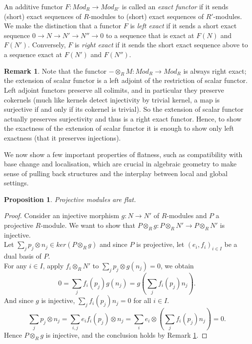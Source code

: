 \documentclass{article}
\theoremstyle{plain}
\newtheorem{proposition}[theorem]{Proposition}
\theoremstyle{definition}
\newtheorem{remark}{Remark}
\begin{document}
\noindent An additive functor $F:Mod_R\rightarrow Mod_{R'}$ is called an \textit{exact functor} if it sends (short) exact sequences of $R$-modules to (short) exact sequences of $R'$-modules. 
We make the distinction that a functor $F$ is \textit{left exact} if it sends a short exact sequence
$0 \rightarrow N \rightarrow N' \rightarrow N'' \rightarrow 0$ to a sequence that is exact at $F(N)$ and $F(N')$. Conversely, $F$ is \textit{right exact} if it sends the short exact sequence above to a sequence exact at $F(N')$ and $F(N'')$.



\begin{remark}
\label{restriction_on_showing_exactness}
Note that the functor $-\otimes_RM:Mod_R \rightarrow Mod_R$ is always right exact;
the extension of scalar functor is a left adjoint of the restriction of scalar functor. 
Left adjoint functors preserve all colimits, and in particular they preserve cokernels (much like kernels detect injectivity by trivial kernel, a map is surjective if and only if its cokernel is trivial). 
So the extension of scalar functor actually preserves surjectivity and thus is a right exact functor.
Hence, to show the exactness of the extension of scalar functor it is enough to show only left exactness (that it preserves injections).
\end{remark}

\noindent We now show a few important properties of flatness, such as compatibility with base change and localisation, which are crucial in algebraic geometry to make sense of pulling back structures and the interplay between local and global settings.


\begin{proposition}
    Projective modules are flat.
\end{proposition}
\begin{proof}
    Consider an injective morphism $g: N \rightarrow N'$ of $R$-modules and $P$ a projective $R$-module. We want to show that $P\otimes_R g:P\otimes_R N'\rightarrow P\otimes_R N'$ is injective.\\
    Let $\sum_j p_j \otimes n_j \in ker(P \otimes_R g)$ and since $P$ is projective, let $(e_i,f_i)_{i\in I}$ be a dual basis of $P$.\\
    For any $i\in I$, apply $f_i\otimes_R N'$ to $\sum_j p_j \otimes g(n_j)=0$, we obtain 
    $$0 = \sum_jf_i(p_j)g(n_j) = g(\sum_jf_i(p_j)n_j).$$
    And since $g$ is injective, $\sum_jf_i(p_j)n_j = 0$ for all $i\in I$.
    $$\sum_j p_j\otimes n_j = \sum_{i,j} e_if_i(p_j)\otimes n_j = \sum_i e_i \otimes (\sum_j f_i(p_j)n_j) = 0.$$
    Hence $P\otimes_R g$ is injective, and the conclusion holds by Remark \ref{restriction_on_showing_exactness}.
\end{proof}
\end{document}
